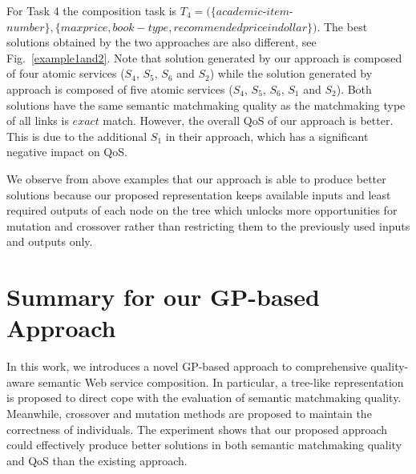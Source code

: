 For Task 4 the composition task is $T_4=(\{academic$-$item$-$number\},\{ maxprice, book-type,recommendedpriceindollar\})$. The best solutions obtained by the two approaches are also different, see Fig.~\ref{example1and2}. Note that solution generated by our approach is composed of four atomic services ($S_4$, $S_5$, $S_6$ and $S_2$) while the solution generated by approach \cite{ma2015hybrid} is composed of  five atomic services ($S_4$, $S_5$, $S_6$, $S_1$ and $S_2$). Both solutions have the same semantic matchmaking quality as the matchmaking type of all links is $exact$ match. However, the overall QoS of our approach is better. This is due to the additional $S_1$ in their approach, which has a significant negative impact on QoS.

We observe from above examples that our approach is able to produce better solutions because our proposed representation keeps available inputs and least required outputs of each node on the tree which unlocks more opportunities for 
mutation and crossover rather than restricting them to the previously used inputs and outputs only.



\section{Summary for our GP-based Approach}\label{summary2}

In this work, we introduces a novel GP-based approach to comprehensive quality-aware semantic Web service composition. In particular, a tree-like representation is proposed to direct cope with the evaluation of semantic matchmaking quality. Meanwhile, crossover and mutation methods are proposed to maintain the correctness of individuals. The experiment  shows that our proposed approach could effectively produce better solutions in both semantic matchmaking quality and QoS than the existing approach.

